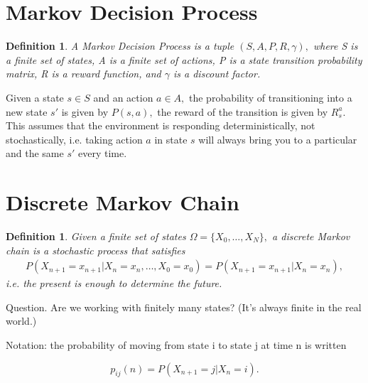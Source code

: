 \documentclass[20pt]{extarticle}
\theoremstyle{plain}
\newtheorem{definition}[theorem]{Definition}
\theoremstyle{definition}
\theoremstyle{remark}
\newcommand{\0}{\varnothing}
\newcommand{\<}{\langle}
\renewcommand{\>}{\rangle}
\begin{document}
\section{Markov Decision Process}

\begin{definition}
  A Markov Decision Process is a tuple \( (S, A, P, R, \gamma), \) where S is a finite set of states, A is a finite set of actions, P is a state transition probability matrix, R is a reward function, and \( \gamma \) is a discount factor.
\end{definition}

Given a state \( s \in S \) and an action \( a \in A, \) the probability of
transitioning into a new state \( s' \) is given by \( P(s, a), \) the reward of
the transition is given by \( R_s^a. \) This assumes that the environment is
responding deterministically, not stochastically, i.e. taking action \( a \) in
state \( s \) will always bring you to a particular and the same \( s' \) every
time.

\section{Discrete Markov Chain}

\begin{definition}
  Given a finite set of states \( \Omega = \{ X_0, \ldots, X_N \}, \) a discrete Markov chain is a stochastic process that satisfies
\small
\begin{align*}
  P \left( X _ { n + 1 } = x _ { n + 1 } | X _ { n } = x _ { n } , \ldots , X _ { 0 } = x _ { 0 } \right) = P \left( X _ { n + 1 } = x _ { n + 1 } | X _ { n } = x _ { n } \right),
\end{align*}
\normalsize
  i.e. the present is enough to determine the future.
\end{definition}

Question. Are we working with finitely many states? (It's always finite in the real world.)

Notation: the probability of moving from state i to state j at time n is written

\[
p _ { i j } ( n ) = P \left( X _ { n + 1 } = j | X _ { n } = i \right).
\]
\end{document}
